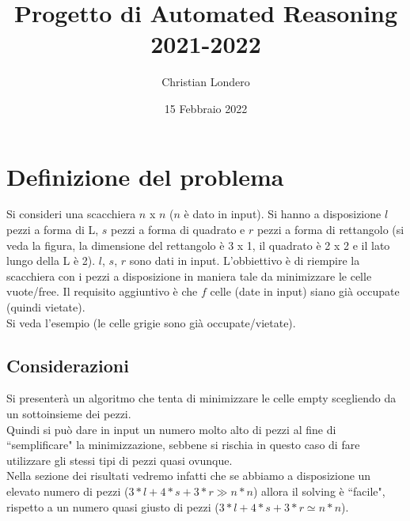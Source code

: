 \documentclass{article}
\title{Progetto di Automated Reasoning\\2021-2022}
\author{ Christian Londero }
\date{15 Febbraio 2022}
\begin{document}
\maketitle

\section{Definizione del problema}
Si consideri una scacchiera $n$ x $n$ ($n$ è dato in input). Si hanno a disposizione $l$ pezzi a forma di L, $s$ pezzi a forma di quadrato e $r$ pezzi a forma di rettangolo (si veda la figura, la dimensione del rettangolo è 3 x 1, il quadrato è 2 x 2 e il lato lungo della L è 2). $l$, $s$, $r$ sono dati in input. L'obbiettivo è di riempire la scacchiera con i pezzi a disposizione in maniera tale da minimizzare le celle vuote/free. Il requisito aggiuntivo è che $f$ celle (date in input) siano già occupate (quindi vietate).\\
Si veda l'esempio (le celle grigie sono già occupate/vietate).

\subsection{Considerazioni}
Si presenterà un algoritmo che tenta di minimizzare le celle empty scegliendo da un sottoinsieme dei pezzi. \\
Quindi si può dare in input un numero molto alto di pezzi al fine di ``semplificare" la minimizzazione, sebbene si rischia in questo caso di fare utilizzare gli stessi tipi di pezzi quasi ovunque.\\
Nella sezione dei risultati vedremo infatti che se abbiamo a disposizione un elevato numero di pezzi ($3*l + 4*s + 3*r \gg n*n$) allora il solving è ``facile", rispetto a un numero quasi giusto di pezzi ($3*l + 4*s + 3*r \simeq n*n$).
\end{document}
